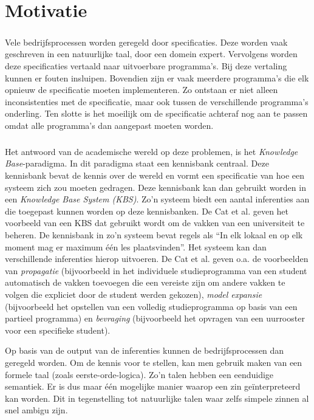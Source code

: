 \chapter{Motivatie}

\paragraph{} Vele bedrijfsprocessen worden geregeld door specificaties. Deze worden vaak geschreven in een natuurlijke taal, door een domein expert. Vervolgens worden deze specificaties vertaald naar uitvoerbare programma's. Bij deze vertaling kunnen er fouten insluipen. Bovendien zijn er vaak meerdere programma's die elk opnieuw de specificatie moeten implementeren. Zo ontstaan er niet alleen inconsistenties met de specificatie, maar ook tussen de verschillende programma's onderling. Ten slotte is het moeilijk om de specificatie achteraf nog aan te passen omdat alle programma's dan aangepast moeten worden.

\paragraph{} Het antwoord van de academische wereld op deze problemen, is het \textit{Knowledge Base}-paradigma. In dit paradigma staat een kennisbank centraal. Deze kennisbank bevat de kennis over de wereld en vormt een specificatie van hoe een systeem zich zou moeten gedragen. Deze kennisbank kan dan gebruikt worden in een \textit{Knowledge Base System (KBS)}. Zo'n systeem biedt een aantal inferenties aan die toegepast kunnen worden op deze kennisbanken. De Cat et al. \cite{IDP} geven het voorbeeld van een KBS dat gebruikt wordt om de vakken van een universiteit te beheren. De kennisbank in zo'n systeem bevat regels als ``In elk lokaal en op elk moment mag er maximum één les plaatsvinden''. Het systeem kan dan verschillende inferenties hierop uitvoeren. De Cat et al. geven o.a. de voorbeelden van \textit{propagatie} (bijvoorbeeld in het individuele studieprogramma van een student automatisch de vakken toevoegen die een vereiste zijn om andere vakken te volgen die expliciet door de student werden gekozen), \textit{model expansie} (bijvoorbeeld het opstellen van een volledig studieprogramma op basis van een partieel programma) en \textit{bevraging} (bijvoorbeeld het opvragen van een uurrooster voor een specifieke student).

Op basis van de output van de inferenties kunnen de bedrijfsprocessen dan geregeld worden. Om de kennis voor te stellen, kan men gebruik maken van een formele taal (zoals eerste-orde-logica). Zo'n talen hebben een eenduidige semantiek. Er is dus maar \'e\'en mogelijke manier waarop een zin ge\"interpreteerd kan worden. Dit in tegenstelling tot natuurlijke talen waar zelfs simpele zinnen al snel ambigu zijn.

